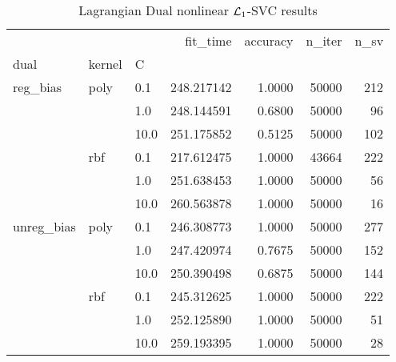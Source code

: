 \begin{table}[H]
\centering
\caption{Lagrangian Dual nonlinear $\protect \mathcal{L}_1$-SVC results}
\label{nonlinear_lagrangian_dual_l1_svc_cv_results}
\begin{tabular}{lllrrrr}
\toprule
           &     &      &    fit\_time &  accuracy &  n\_iter &  n\_sv \\
dual & kernel & C &             &           &         &       \\
\midrule
reg\_bias & poly & 0.1  &  248.217142 &    1.0000 &   50000 &   212 \\
           &     & 1.0  &  248.144591 &    0.6800 &   50000 &    96 \\
           &     & 10.0 &  251.175852 &    0.5125 &   50000 &   102 \\
           & rbf & 0.1  &  217.612475 &    1.0000 &   43664 &   222 \\
           &     & 1.0  &  251.638453 &    1.0000 &   50000 &    56 \\
           &     & 10.0 &  260.563878 &    1.0000 &   50000 &    16 \\
unreg\_bias & poly & 0.1  &  246.308773 &    1.0000 &   50000 &   277 \\
           &     & 1.0  &  247.420974 &    0.7675 &   50000 &   152 \\
           &     & 10.0 &  250.390498 &    0.6875 &   50000 &   144 \\
           & rbf & 0.1  &  245.312625 &    1.0000 &   50000 &   222 \\
           &     & 1.0  &  252.125890 &    1.0000 &   50000 &    51 \\
           &     & 10.0 &  259.193395 &    1.0000 &   50000 &    28 \\
\bottomrule
\end{tabular}
\end{table}
